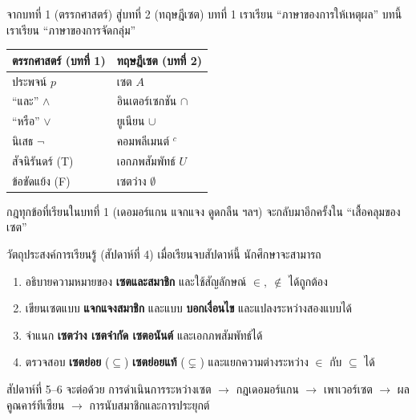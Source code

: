 
\begin{frame}[plain]
  \maketitle
\end{frame}

\begin{frame}{จากบทที่ 1 (ตรรกศาสตร์) สู่บทที่ 2 (ทฤษฎีเซต)}
  บทที่ 1 เราเรียน ``ภาษาของการให้เหตุผล'' บทนี้เราเรียน ``ภาษาของการจัดกลุ่ม''
  \begin{center}
  \begin{tabular}{|l|l|}
    \hline
    \textbf{ตรรกศาสตร์ (บทที่ 1)} & \textbf{ทฤษฎีเซต (บทที่ 2)} \\ \hline
    ประพจน์ $p$ & เซต $A$ \\ \hline
    ``และ'' $\land$ & อินเตอร์เซกชัน $\cap$ \\ \hline
    ``หรือ'' $\lor$ & ยูเนียน $\cup$ \\ \hline
    นิเสธ $\neg$ & คอมพลีเมนต์ $^c$ \\ \hline
    สัจนิรันดร์ (T) & เอกภพสัมพัทธ์ $U$ \\ \hline
    ข้อขัดแย้ง (F) & เซตว่าง $\emptyset$ \\ \hline
  \end{tabular}
  \end{center}
  \vspace{0.3em}
  \begin{exampleblock}{}
    กฎทุกข้อที่เรียนในบทที่ 1 (เดอมอร์แกน แจกแจง ดูดกลืน ฯลฯ) จะกลับมาอีกครั้งใน ``เสื้อคลุมของเซต''
  \end{exampleblock}
\end{frame}

\begin{frame}{วัตถุประสงค์การเรียนรู้ (สัปดาห์ที่ 4)}
  เมื่อเรียนจบสัปดาห์นี้ นักศึกษาจะสามารถ
  \begin{enumerate}
    \item อธิบายความหมายของ \textbf{เซตและสมาชิก} และใช้สัญลักษณ์ $\in,\ \notin$ ได้ถูกต้อง
    \item เขียนเซตแบบ \textbf{แจกแจงสมาชิก} และแบบ \textbf{บอกเงื่อนไข} และแปลงระหว่างสองแบบได้
    \item จำแนก \textbf{เซตว่าง เซตจำกัด เซตอนันต์} และเอกภพสัมพัทธ์ได้
    \item ตรวจสอบ \textbf{เซตย่อย} ($\subseteq$) \textbf{เซตย่อยแท้} ($\subsetneq$) และแยกความต่างระหว่าง $\in$ กับ $\subseteq$ ได้
  \end{enumerate}
  \vspace{0.5em}
  \begin{exampleblock}{สัปดาห์ที่ 5--6 จะต่อด้วย}
    การดำเนินการระหว่างเซต $\rightarrow$ กฎเดอมอร์แกน $\rightarrow$ เพาเวอร์เซต
    $\rightarrow$ ผลคูณคาร์ทีเซียน $\rightarrow$ การนับสมาชิกและการประยุกต์
  \end{exampleblock}
\end{frame}

